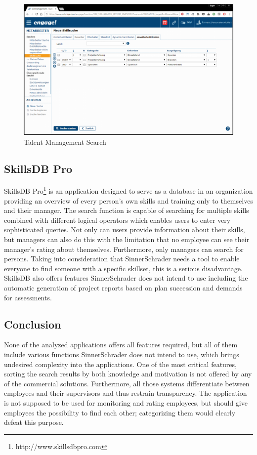 \begin{figure}[!htp]
    \centering
    \includegraphics[width=\textwidth]{images/talent_management_-_skillmanagement_-_skillsuche.png}
    \caption{Talent Management Search}
    \label{fig:talent_management}
\end{figure}

\subsection{SkillsDB Pro}
SkillsDB Pro\footnote{http://www.skillsdbpro.com} is an application designed to serve as a database in an organization providing an overview of every person’s own skills and training only to themselves and their manager. The search function is capable of searching for multiple skills combined with different logical operators which enables users to enter very sophisticated queries.
Not only can users provide information about their skills, but managers can also do this with the limitation that no employee can see their manager’s rating about themselves.
Furthermore, only managers can search for persons. Taking into consideration that SinnerSchrader needs a tool to enable everyone to find someone with a specific skillset, this is a serious disadvantage.
SkillsDB also offers features SinnerSchrader does not intend to use including the automatic generation of project reports based on plan succession and demands for assessments.

\subsection{Conclusion}
None of the analyzed applications offers all features required, but all of them include various functions SinnerSchrader does not intend to use, which brings undesired complexity into the applications.
One of the most critical features, sorting the search results by both knowledge and motivation is not offered by any of the commercial solutions.
Furthermore, all those systems differentiate between employees and their supervisors and thus restrain transparency. The application is not supposed to be used for monitoring and rating employees, but should give employees the possibility to find each other; categorizing them would clearly defeat this purpose.

